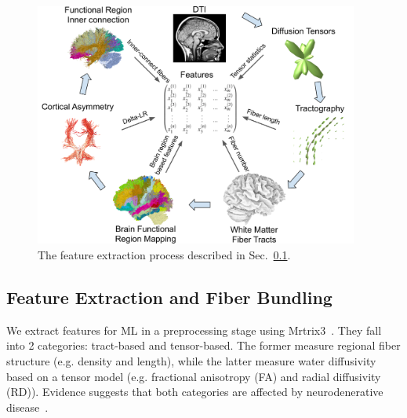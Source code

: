 \begin{figure}[t]
\centering
\includegraphics[width=0.95\textwidth]{images/Brainfeatures.png}
\caption{The feature extraction process described in Sec.~\ref{sec:extraction}.
}
\label{fig:Extraction}
\end{figure}


\subsection{Feature Extraction and Fiber Bundling}
\label{sec:extraction}

\noindent We extract features for ML in a preprocessing stage using Mrtrix3~\cite{tournier2012mrtrix}. They fall into 2 categories: tract-based and tensor-based. The former measure regional fiber structure (e.g. density and length), while the latter measure water diffusivity based on a tensor model (e.g. fractional anisotropy (FA) 
and radial diffusivity (RD)). Evidence suggests that both categories are affected by neurodenerative disease~\cite{sundaram2008diffusion,ji2015white}.

